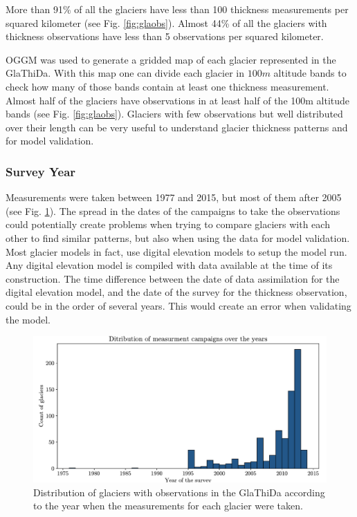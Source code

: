 More than 91\% of all the glaciers have less than 100 thickness measurements per squared kilometer (see Fig. \ref{fig:glaobs}). Almost 44\% of all the glaciers with thickness observations have less than 5 observations per squared kilometer.

OGGM was used to generate a gridded map of each glacier represented in the GlaThiDa. With this map one can divide each glacier in $100m$ altitude bands to check how many of those bands contain at least one thickness measurement.
Almost half of the glaciers have observations in at least half of the 100m altitude bands (see Fig. \ref{fig:glaobs}). Glaciers with few observations but well distributed over their length can be very useful to understand glacier thickness patterns and for model validation.

\subsubsection{Survey Year}\label{survey-year}
Measurements were taken between 1977 and 2015, but most of them after 2005 (see Fig. \ref{fig:glayears}). The spread in the dates of the campaigns to take the observations could potentially create problems when trying to compare glaciers with each other to find similar patterns, but also when using the data for model validation.
Most glacier models in fact, use digital elevation models to setup the model run. Any digital elevation model is compiled with data available at the time of its construction. The time difference between the date of data assimilation for the digital elevation model, and the date of the survey for the thickness observation, could be in the order of several years. This would create an error when validating the model.
\begin{figure}[!tp]
	\centering		  
	\includegraphics[width=1.\textwidth]{figures/Observations_per_year.pdf}
	\caption{Distribution of glaciers with observations in the GlaThiDa according to the year when the measurements for each glacier were taken.}
	\label{fig:glayears}
\end{figure}


